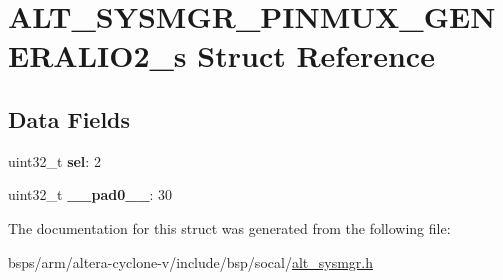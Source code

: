 \hypertarget{structALT__SYSMGR__PINMUX__GENERALIO2__s}{}\section{A\+L\+T\+\_\+\+S\+Y\+S\+M\+G\+R\+\_\+\+P\+I\+N\+M\+U\+X\+\_\+\+G\+E\+N\+E\+R\+A\+L\+I\+O2\+\_\+s Struct Reference}
\label{structALT__SYSMGR__PINMUX__GENERALIO2__s}
\subsection*{Data Fields}
\begin{DoxyCompactItemize}
\item 
\mbox{\label{structALT__SYSMGR__PINMUX__GENERALIO2__s_af94ee03b449da2405e48a1588d7e4531}} 
uint32\+\_\+t {\bfseries sel}\+: 2
\item 
\mbox{\label{structALT__SYSMGR__PINMUX__GENERALIO2__s_ad085d3462504f4961d52da39801468f4}} 
uint32\+\_\+t {\bfseries \+\_\+\+\_\+pad0\+\_\+\+\_\+}\+: 30
\end{DoxyCompactItemize}


The documentation for this struct was generated from the following file\+:\begin{DoxyCompactItemize}
\item 
bsps/arm/altera-\/cyclone-\/v/include/bsp/socal/\mbox{\hyperlink{alt__sysmgr_8h}{alt\+\_\+sysmgr.\+h}}\end{DoxyCompactItemize}
